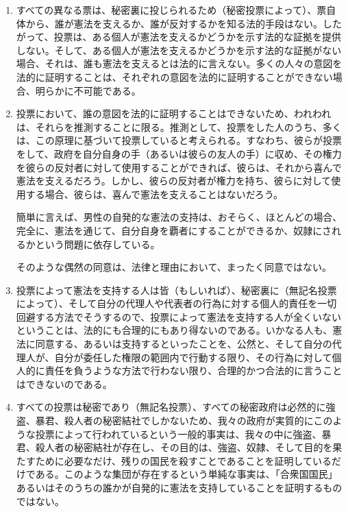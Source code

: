 \documentclass[dvipdfmx, uplatex, tate, landscape]{utbook}
\begin{document}
\begin{enumerate}
  \item すべての異なる票は、秘密裏に投じられるため（秘密投票によって）、票自体から、誰が憲法を支えるか、誰が反対するかを知る法的手段はない。したがって、投票は、ある個人が憲法を支えるかどうかを示す法的な証拠を提供しない。そして、ある個人が憲法を支えるかどうかを示す法的な証拠がない場合、それは、誰も憲法を支えるとは法的に言えない。多くの人々の意図を法的に証明することは、それぞれの意図を法的に証明することができない場合、明らかに不可能である。

  \item 投票において、誰の意図を法的に証明することはできないため、われわれは、それらを推測することに限る。推測として、投票をした人のうち、多くは、この原理に基づいて投票していると考えられる。すなわち、彼らが投票をして、政府を自分自身の手（あるいは彼らの友人の手）に収め、その権力を彼らの反対者に対して使用することができれば、彼らは、それから喜んで憲法を支えるだろう。しかし、彼らの反対者が権力を持ち、彼らに対して使用する場合、彼らは、喜んで憲法を支えることはないだろう。

  簡単に言えば、男性の自発的な憲法の支持は、おそらく、ほとんどの場合、完全に、憲法を通じて、自分自身を覇者にすることができるか、奴隷にされるかという問題に依存している。

  そのような偶然の同意は、法律と理由において、まったく同意ではない。

\item 投票によって憲法を支持する人は皆（もしいれば）、秘密裏に（無記名投票によって）、そして自分の代理人や代表者の行為に対する個人的責任を一切回避する方法でそうするので、投票によって憲法を支持する人が全くいないということは、法的にも合理的にもあり得ないのである。いかなる人も、憲法に同意する、あるいは支持するといったことを、公然と、そして自分の代理人が、自分が委任した権限の範囲内で行動する限り、その行為に対して個人的に責任を負うような方法で行わない限り、合理的かつ合法的に言うことはできないのである。
\item すべての投票は秘密であり（無記名投票）、すべての秘密政府は必然的に強盗、暴君、殺人者の秘密結社でしかないため、我々の政府が実質的にこのような投票によって行われているという一般的事実は、我々の中に強盗、暴君、殺人者の秘密結社が存在し、その目的は、強盗、奴隷、そして目的を果たすために必要なだけ、残りの国民を殺すことであることを証明しているだけである。このような集団が存在するという単純な事実は、「合衆国国民」あるいはそのうちの誰かが自発的に憲法を支持していることを証明するものではない。

\end{enumerate}
\end{document}
